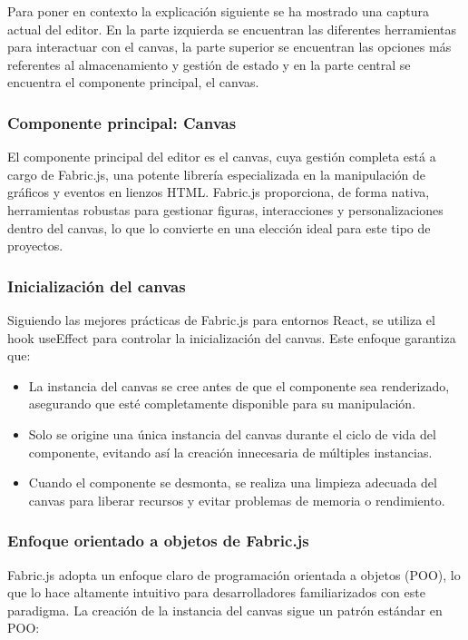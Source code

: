 Para poner en contexto la explicación siguiente se ha mostrado una captura actual del editor. En la parte izquierda se encuentran las diferentes herramientas para interactuar con el canvas, la parte superior se encuentran las opciones más referentes al almacenamiento y gestión de estado y en la parte central se encuentra el componente principal, el canvas.

\subsubsection{Componente principal: Canvas}

El componente principal del editor es el canvas, cuya gestión completa está a cargo de Fabric.js, una potente librería especializada en la manipulación de gráficos y eventos en lienzos HTML. Fabric.js proporciona, de forma nativa, herramientas robustas para gestionar figuras, interacciones y personalizaciones dentro del canvas, lo que lo convierte en una elección ideal para este tipo de proyectos.

\subsubsection{Inicialización del canvas}

Siguiendo las mejores prácticas de Fabric.js para entornos React, se utiliza el hook useEffect para controlar la inicialización del canvas. Este enfoque garantiza que:

\begin{itemize}
    \item La instancia del canvas se cree antes de que el componente sea renderizado, asegurando que esté completamente disponible para su manipulación.
    \item Solo se origine una única instancia del canvas durante el ciclo de vida del componente, evitando así la creación innecesaria de múltiples instancias.
    \item Cuando el componente se desmonta, se realiza una limpieza adecuada del canvas para liberar recursos y evitar problemas de memoria o rendimiento.
\end{itemize}

\subsubsection{Enfoque orientado a objetos de Fabric.js}

Fabric.js adopta un enfoque claro de programación orientada a objetos (POO), lo que lo hace altamente intuitivo para desarrolladores familiarizados con este paradigma. La creación de la instancia del canvas sigue un patrón estándar en POO:

